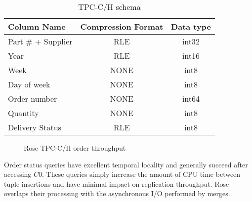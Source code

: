 \documentclass{vldb}
\newcommand{\rows}{Rose\xspace}
\begin{document}
\begin{table}
\caption{TPC-C/H schema}
\centering
\label{tab:tpc-schema}
\begin{tabular}{|l|c|c|} \hline
Column Name     & Compression Format &  Data type\\ \hline
Part \# + Supplier & RLE       & int32              \\ \hline
Year            & RLE       & int16              \\\hline
Week            & NONE      & int8               \\\hline
Day of week     & NONE      & int8               \\\hline
Order number    & NONE      & int64              \\\hline
Quantity        & NONE      & int8               \\\hline
Delivery Status & RLE       & int8               \\\hline
\end{tabular}
\end{table}

\begin{figure}
\centering {}
\caption{\rows TPC-C/H order throughput}
\label{fig:tpch}
\end{figure}




Order status queries have excellent temporal locality and generally
succeed after accessing $C0$.  These queries simply increase the
amount of CPU time between tuple insertions and have minimal impact on
replication throughput.  \rows overlaps their processing with the
asynchronous I/O performed by merges.
\end{document}
